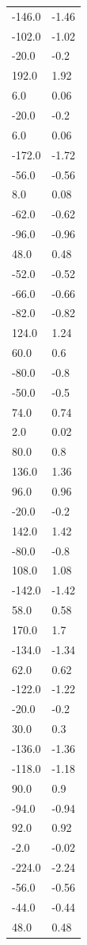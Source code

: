 \begin{longtable}{ll}
-146.0 & -1.46 \\
-102.0 & -1.02 \\
-20.0 & -0.2 \\
192.0 & 1.92 \\
6.0 & 0.06 \\
-20.0 & -0.2 \\
6.0 & 0.06 \\
-172.0 & -1.72 \\
-56.0 & -0.56 \\
8.0 & 0.08 \\
-62.0 & -0.62 \\
-96.0 & -0.96 \\
48.0 & 0.48 \\
-52.0 & -0.52 \\
-66.0 & -0.66 \\
-82.0 & -0.82 \\
124.0 & 1.24 \\
60.0 & 0.6 \\
-80.0 & -0.8 \\
-50.0 & -0.5 \\
74.0 & 0.74 \\
2.0 & 0.02 \\
80.0 & 0.8 \\
136.0 & 1.36 \\
96.0 & 0.96 \\
-20.0 & -0.2 \\
142.0 & 1.42 \\
-80.0 & -0.8 \\
108.0 & 1.08 \\
-142.0 & -1.42 \\
58.0 & 0.58 \\
170.0 & 1.7 \\
-134.0 & -1.34 \\
62.0 & 0.62 \\
-122.0 & -1.22 \\
-20.0 & -0.2 \\
30.0 & 0.3 \\
-136.0 & -1.36 \\
-118.0 & -1.18 \\
90.0 & 0.9 \\
-94.0 & -0.94 \\
92.0 & 0.92 \\
-2.0 & -0.02 \\
-224.0 & -2.24 \\
-56.0 & -0.56 \\
-44.0 & -0.44 \\
48.0 & 0.48 \\

\end{longtable}
